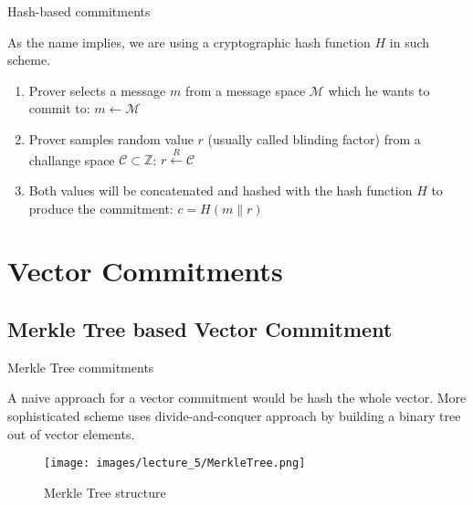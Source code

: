 \documentclass[xcolor={usenames,dvipsnames}]{beamer}
\begin{document}
    \begin{frame}{Hash-based commitments}

        As the name implies, we are using a cryptographic hash function \(H\) in such scheme.

        \begin{definition}
            \begin{enumerate}
                \item Prover selects a message $m$ from a message space $\mathcal{M}$ which he wants to commit to:
                    $m \leftarrow \mathcal{M}$
            
                \item Prover samples random value $r$ (usually called blinding factor) from a challange space $\mathcal{C} \subset \mathbb{Z}$:
                    $r \xleftarrow{R} \mathcal{C}$
                
                \item Both values will be concatenated and hashed with the hash function $H$ to produce the commitment:
                    $c = H(m \parallel r)$
            \end{enumerate}
        \end{definition}

    \end{frame}

    \section{Vector Commitments}

    \subsection{Merkle Tree based Vector Commitment}

    \begin{frame}{Merkle Tree commitments}

        A naive approach for a vector commitment would be hash the whole vector. 
        More sophisticated scheme uses divide-and-conquer approach by building a binary tree out of vector elements.

        \begin{figure}
            \centering
            \texttt{[image: images/lecture\_5/MerkleTree.png]}
            \caption{Merkle Tree structure}
        \end{figure}

    \end{frame}
\end{document}
